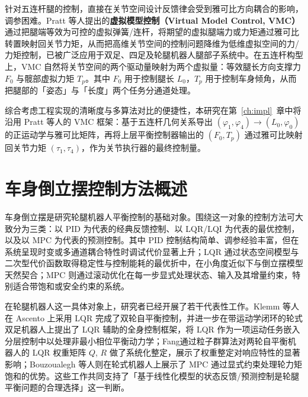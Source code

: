 \documentclass{smbuthesis}
\begin{document}
针对五连杆腿的控制，直接在关节空间设计反馈律会受到雅可比方向耦合的影响，调参困难。Pratt 等人提出的\textbf{虚拟模型控制（Virtual Model Control, VMC）}\cite{Pratt2001VMC}通过把腿端等效为可控的虚拟弹簧/连杆，将期望的虚拟腿端力或力矩通过雅可比转置映射回关节力矩，从而把高维关节空间的控制问题降维为低维虚拟空间的力/力矩控制，已被广泛应用于双足、四足及轮腿机器人腿部子系统中。在五连杆构型上，VMC 自然将关节空间的两个驱动量映射为两个虚拟量：等效腿长方向支撑力 $F_0$ 与髋部虚拟力矩 $T_p$。其中 $F_0$ 用于控制腿长 $L_0$，$T_p$ 用于控制车身倾角，从而把腿部的「姿态」与「长度」两个任务分通道处理。

综合考虑工程实现的清晰度与多算法对比的便捷性，本研究在第~\ref{ch:impl}~章中将沿用 Pratt 等人的 VMC 框架：基于五连杆几何关系导出 $(\varphi_1, \varphi_4) \to (L_0, \varphi_0)$ 的正运动学与雅可比矩阵，再将上层平衡控制器输出的 $(F_0, T_p)$ 通过雅可比映射回关节力矩 $(\tau_1, \tau_4)$，作为关节执行器的最终控制量。

\section{车身倒立摆控制方法概述}

车身倒立摆是研究轮腿机器人平衡控制的基础对象。围绕这一对象的控制方法可大致分为三类：以 PID 为代表的经典反馈控制、以 LQR/LQI 为代表的最优控制，以及以 MPC 为代表的预测控制\cite{Pathak2005WheeledIP,AndersonMoore1990OptControl,KwakernaakSivan1972LinearOpt}。其中 PID 控制结构简单、调参经验丰富，但在系统呈现时变或多通道耦合特性时调试代价显著上升\cite{Astrom1995PID}；LQR 通过状态空间模型与二次型代价函数取得稳定性与控制能耗的最优折中，在小角度近似下与倒立摆模型天然契合\cite{AndersonMoore1990OptControl}；MPC 则通过滚动优化在每一步显式处理状态、输入及其增量约束，特别适合带饱和或安全约束的系统\cite{Mayne2000ConstrainedMPC,Rawlings2017MPC}。

在轮腿机器人这一具体对象上，研究者已经开展了若干代表性工作。Klemm 等人在 Ascento 上采用 LQR 完成了双轮自平衡控制\cite{Klemm2019Ascento}，并进一步在带运动学闭环的轮式双足机器人上提出了 LQR 辅助的全身控制框架\cite{Klemm2020LQRWBC}，将 LQR 作为一项运动任务嵌入分层控制中以处理非最小相位平衡动力学；Fang\cite{Fang2014PSOLQR}通过粒子群算法对两轮自平衡机器人的 LQR 权重矩阵 $Q$, $R$ 做了系统化整定，展示了权重整定对响应特性的显著影响；Bouzoualegh 等人则在轮式机器人上展示了 MPC 通过显式约束处理轮力矩饱和的优势\cite{Bouzoualegh2018DiffDriveMPC}。这些工作共同支持了「基于线性化模型的状态反馈/预测控制是轮腿平衡问题的合理选择」这一判断。
\end{document}
